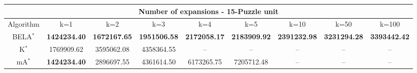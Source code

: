 \begin{tabular}{c|cccccccc}\toprule
\multicolumn{9}{c}{Number of expansions - 15-Puzzle unit}\\ \midrule
Algorithm & k=1 & k=2 & k=3 & k=4 & k=5 & k=10 & k=50 & k=100 \\ \midrule
BELA$^*$ & \textbf{1424234.40} & \textbf{1672167.65} & \textbf{1951506.58} & \textbf{2172058.17} & \textbf{2183909.92} & \textbf{2391232.98} & \textbf{3231294.28} & \textbf{3393442.42} \\
K$^*$ & 1769909.62 & 3595062.08 & 4358364.55 & -- & -- & -- & -- & -- \\
mA$^*$ & \textbf{1424234.40} & 2896697.55 & 4361614.50 & 6173265.75 & 7205712.48 & -- & -- & -- \\ \bottomrule 
\end{tabular}
